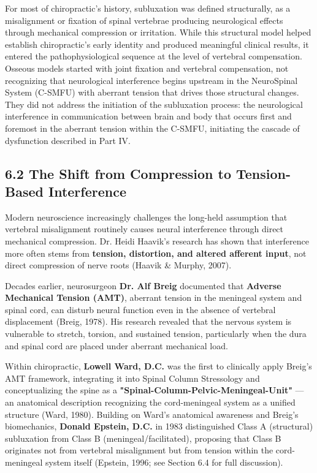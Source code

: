 \documentclass[11pt,letterpaper]{article}
\begin{document}
For most of chiropractic's history, subluxation was defined structurally, as a misalignment or fixation of spinal vertebrae producing neurological effects through mechanical compression or irritation. While this structural model helped establish chiropractic's early identity and produced meaningful clinical results, it entered the pathophysiological sequence at the level of vertebral compensation. Osseous models started with joint fixation and vertebral compensation, not recognizing that neurological interference begins upstream in the NeuroSpinal System (C-SMFU) with aberrant tension that drives those structural changes. They did not address the initiation of the subluxation process: the neurological interference in communication between brain and body that occurs first and foremost in the aberrant tension within the C-SMFU, initiating the cascade of dysfunction described in Part IV.


\subsection{6.2 The Shift from Compression to Tension-Based Interference}

Modern neuroscience increasingly challenges the long-held assumption that vertebral misalignment routinely causes neural interference through direct mechanical compression. Dr. Heidi Haavik's research has shown that interference more often stems from \textbf{tension, distortion, and altered afferent input}, not direct compression of nerve roots (Haavik \& Murphy, 2007).


Decades earlier, neurosurgeon \textbf{Dr. Alf Breig} documented that \textbf{Adverse Mechanical Tension (AMT)}, aberrant tension in the meningeal system and spinal cord, can disturb neural function even in the absence of vertebral displacement (Breig, 1978). His research revealed that the nervous system is vulnerable to stretch, torsion, and sustained tension, particularly when the dura and spinal cord are placed under aberrant mechanical load.


Within chiropractic, \textbf{Lowell Ward, D.C.} was the first to clinically apply Breig's AMT framework, integrating it into Spinal Column Stressology and conceptualizing the spine as a \textbf{"Spinal-Column-Pelvic-Meningeal-Unit"} — an anatomical description recognizing the cord-meningeal system as a unified structure (Ward, 1980). Building on Ward's anatomical awareness and Breig's biomechanics, \textbf{Donald Epstein, D.C.} in 1983 distinguished Class A (structural) subluxation from Class B (meningeal/facilitated), proposing that Class B originates not from vertebral misalignment but from tension within the cord-meningeal system itself (Epstein, 1996; see Section 6.4 for full discussion).
\end{document}
